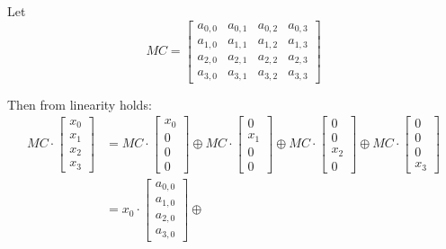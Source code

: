 \documentclass[11pt,oneside,final]{fithesis2}
\begin{document}
    Let 
    \begin{equation}
        MC = \begin{bmatrix} 
	a_{0,0} & a_{0,1} & a_{0,2} & a_{0,3}  \\
	a_{1,0} & a_{1,1} & a_{1,2} & a_{1,3}  \\
	a_{2,0} & a_{2,1} & a_{2,2} & a_{2,3}  \\
	a_{3,0} & a_{3,1} & a_{3,2} & a_{3,3}
     \end{bmatrix}%
     \end{equation}

    Then from linearity holds:
    \begin{equation} \label{eq:mmul_linearity}
    \begin{aligned}
    MC \cdot \begin{bmatrix}
	x_0\\
	x_1\\
	x_2\\
	x_3
    \end{bmatrix} &= MC \cdot \begin{bmatrix} x_0 \\ 0   \\ 0    \\ 0   \end{bmatrix} \oplus 
		     MC \cdot \begin{bmatrix} 0   \\ x_1 \\ 0    \\ 0   \end{bmatrix} \oplus 
		     MC \cdot \begin{bmatrix} 0   \\ 0   \\ x_2  \\ 0   \end{bmatrix} \oplus
		     MC \cdot \begin{bmatrix} 0   \\ 0   \\ 0    \\ x_3 \end{bmatrix} \\ 
                 &= x_0 \cdot \begin{bmatrix} a_{0,0} \\ a_{1,0} \\ a_{2,0} \\ a_{3,0} \end{bmatrix} \oplus

\end{aligned}
\end{equation}
\end{document}
